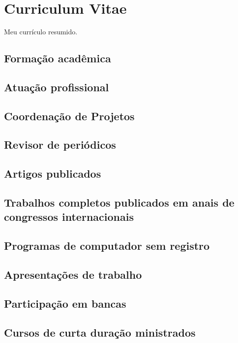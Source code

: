 \chapter{Curriculum Vitae}

Meu currículo resumido.


\section{Formação acadêmica}


\section{Atuação profissional}


\section{Coordenação de Projetos}


\section{Revisor de periódicos}


\section{Artigos publicados}


\section{Trabalhos completos publicados em anais de congressos internacionais}


\section{Programas de computador sem registro}


\section{Apresentações de trabalho}


\section{Participação em bancas}


\section{Cursos de curta duração ministrados}
